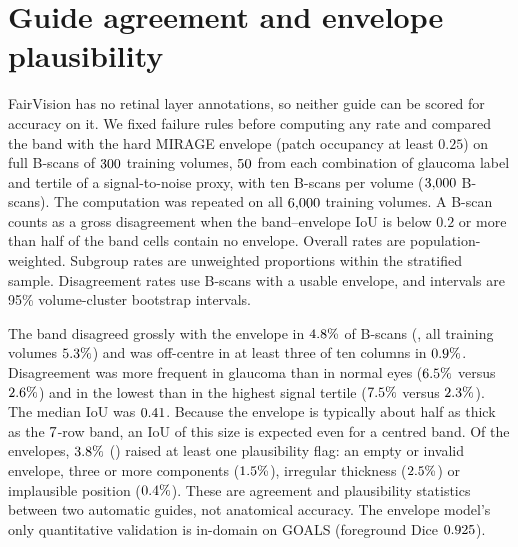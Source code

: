 \section{Guide agreement and envelope plausibility}
\label{app:guides}
FairVision has no retinal layer annotations, so neither guide can be scored for
accuracy on it. We fixed failure rules before computing any rate and compared
the \ArmBest{} band with the hard MIRAGE envelope (patch occupancy at least
$0.25$) on full B-scans of $300$ training volumes,
$50$ from each combination of glaucoma label and tertile of a
signal-to-noise proxy, with ten B-scans per volume ($3{,}000$ B-scans).
The computation was repeated on all $6{,}000$ training volumes. A
B-scan counts as a gross disagreement when the band--envelope IoU is below
$0.2$ or more than half of the band cells contain no envelope. Overall rates
are population-weighted. Subgroup rates are unweighted proportions within the
stratified sample. Disagreement rates use B-scans with a usable envelope, and
intervals are 95\% volume-cluster bootstrap intervals.

The band disagreed grossly with the envelope in $4.8\%$ of B-scans
(\CRFOneCI, all training volumes $5.3\%$) and was off-centre in at
least three of ten columns in $0.9\%$. Disagreement was more frequent in
glaucoma than in normal eyes ($6.5\%$ versus $2.6\%$) and
in the lowest than in the highest signal tertile ($7.5\%$ versus
$2.3\%$). The median IoU was $0.41$. Because the envelope is
typically about half as thick as the $7$-row band, an IoU of this
size is expected even for a centred band. Of the envelopes, $3.8\%$
(\CREnvAnyFlagCI) raised at least one plausibility flag: an empty or invalid
envelope, three or more components ($1.5\%$), irregular thickness
($2.5\%$) or implausible position ($0.4\%$). These are agreement and plausibility
statistics between two automatic guides, not anatomical accuracy. The envelope
model's only quantitative validation is in-domain on GOALS (foreground Dice
$0.925$).

